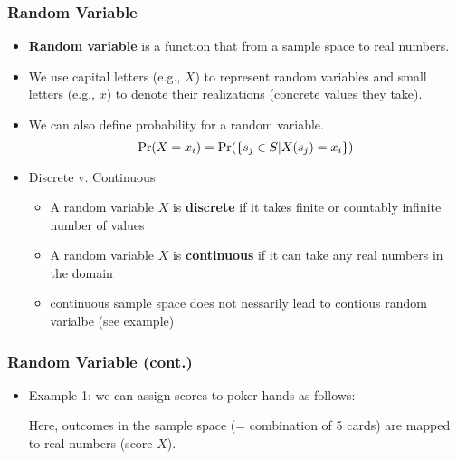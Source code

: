 \documentclass[pdflatex, 12pt]{beamer}
\begin{document}
\begin{frame}
\frametitle{Random Variable}
\begin{itemize}
\item \textbf{Random variable} is a function that from a sample space to real numbers.
\vspace{0.4cm}
\item We use capital letters (e.g., $X$) to represent random variables and small letters (e.g., $x$) to denote their realizations (concrete values they take).
\vspace{0.4cm}
\item We can also define probability for a random variable.
 \begin{equation}
 \Pr(X = x_i) = \Pr(\left\{s_j \in S|X(s_j) = x_i\right\}) \notag
 \end{equation}
\item Discrete v. Continuous 
 \begin{itemize}
 \item A random variable $X$ is \textbf{discrete} if it takes finite or countably infinite number of values
 \item A random variable $X$ is \textbf{continuous} if it can take any real numbers in the domain
 \item continuous sample space does not nessarily lead to contious random varialbe (see example)
 \end{itemize}
\end{itemize}
\end{frame}

\begin{frame}
\frametitle{Random Variable (cont.)}
\begin{itemize}
\item Example 1: we can assign scores to poker hands as follows:
 \begin{table}
 \end{table}
Here, outcomes in the sample space (= combination of 5 cards) are mapped to real numbers (score $X$).
\end{itemize} 
\end{frame}
\end{document}
